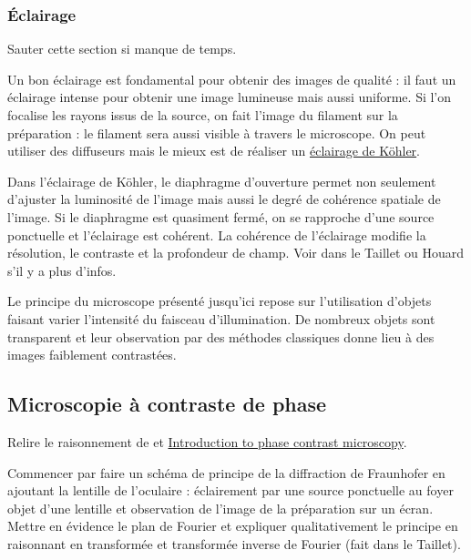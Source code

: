 \subsubsection{Éclairage}

Sauter cette section si manque de temps.

Un bon éclairage est fondamental pour obtenir des images de qualité : il faut un éclairage intense pour obtenir une image lumineuse mais aussi uniforme.
Si l'on focalise les rayons issus de la source, on fait l'image du filament sur la préparation : le filament sera aussi visible à travers le microscope.
On peut utiliser des diffuseurs mais le mieux est de réaliser un \href{http://www.optique-ingenieur.org/fr/cours/OPI_fr_M03_C03/co/Contenu_03.html}{éclairage de Köhler}.

\begin{remarque}
Dans l'éclairage de Köhler, le diaphragme d'ouverture permet non seulement d'ajuster la luminosité de l'image mais aussi le degré de cohérence spatiale de l'image.
Si le diaphragme est quasiment fermé, on se rapproche d'une source ponctuelle et l'éclairage est cohérent.
La cohérence de l'éclairage modifie la résolution, le contraste et la profondeur de champ.
Voir dans le Taillet ou Houard s'il y a plus d'infos. 
\end{remarque}

\begin{transition}
Le principe du microscope présenté jusqu'ici repose sur l'utilisation d'objets faisant varier l'intensité du faisceau d'illumination.
De nombreux objets sont transparent et leur observation par des méthodes classiques donne lieu à des images faiblement contrastées.
\end{transition}

\subsection{Microscopie à contraste de phase}

Relire le raisonnement de \cite{Kastler1948} et \href{https://www.microscopyu.com/techniques/phase-contrast/introduction-to-phase-contrast-microscopy}{Introduction to phase contrast microscopy}.

Commencer par faire un schéma de principe de la diffraction de Fraunhofer en ajoutant la lentille de l'oculaire \cite{Faget1962} : éclairement par une source ponctuelle au foyer objet d'une lentille et observation de l'image de la préparation sur un écran.
Mettre en évidence le plan de Fourier et expliquer qualitativement le principe en raisonnant en transformée et transformée inverse de Fourier (fait dans le Taillet).

